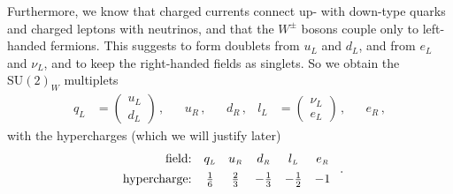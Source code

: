 \documentclass[12pt]{report}
\newcommand{\ls}{{\ensuremath{\scriptscriptstyle L}}}
\newcommand{\rs}{{\ensuremath{\scriptscriptstyle R}}}
\newcommand{\2}{\ensuremath{\sqrt{2}\,}}
\begin{document}
{      Furthermore, we know that charged currents connect up- with down-type
      quarks and charged leptons with neutrinos, and that the $W^\pm$ bosons couple only to
      left-handed fermions. This suggests to form doublets  from $u_\ls$ and $d_\ls$, and
      from $e_\ls$ and $\nu_\ls$, and to keep the right-handed fields as singlets. So we 
      obtain the $\mathrm{SU(2)}_W$ multiplets
       \begin{align}
        q_\ls&=\begin{pmatrix} u_\ls \\ d_\ls\end{pmatrix}\,, &&u_\rs\,, && d_\rs\,,  &
        l_\ls&=\begin{pmatrix} \nu_\ls \\  e_\ls\end{pmatrix}\,, &&  e_\rs\,,
      \end{align}
      with the hypercharges (which we will justify later) 
      \begin{align}\label{eq:hypercharges}
        \begin{array}{rccccc}
          \text{field:} & q_\ls & u_\rs & d_\rs & l_\ls & e_\rs\\
          \text{hypercharge:\rule[12pt]{0pt}{1pt}} & \frac{1}{6} & \frac{2}{3} & -\frac{1}{3} &
          -\frac{1}{2} & -1 
        \end{array}\;.
      \end{align}

}
\end{document}

